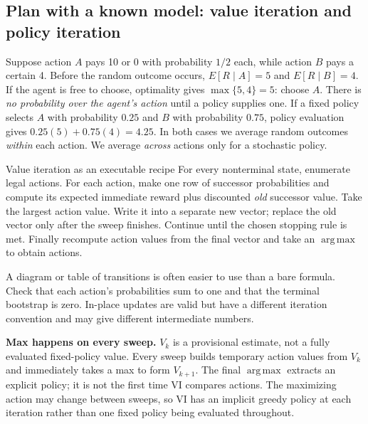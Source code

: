 \documentclass[10pt,a4paper]{article}
\newcommand{\argmax}{\operatorname*{arg\,max}}
\begin{document}
\subsection{Plan with a known model: value iteration and policy iteration}
\begin{idea}
Suppose action $A$ pays 10 or 0 with probability $1/2$ each, while action $B$ pays a certain 4. Before the random outcome occurs, $E[R\mid A]=5$ and $E[R\mid B]=4$. If the agent is free to choose, optimality gives $\max\{5,4\}=5$: choose $A$. There is \emph{no probability over the agent's action} until a policy supplies one. If a fixed policy selects $A$ with probability $0.25$ and $B$ with probability $0.75$, policy evaluation gives $0.25(5)+0.75(4)=4.25$. In both cases we average random outcomes \emph{within} each action. We average \emph{across} actions only for a stochastic policy.
\end{idea}
\begin{card}{Value iteration as an executable recipe}
For every nonterminal state, enumerate legal actions. For each action, make one row of successor probabilities and compute its expected immediate reward plus discounted \emph{old} successor value. Take the largest action value. Write it into a separate new vector; replace the old vector only after the sweep finishes. Continue until the chosen stopping rule is met. Finally recompute action values from the final vector and take an $\argmax$ to obtain actions.

A diagram or table of transitions is often easier to use than a bare formula. Check that each action's probabilities sum to one and that the terminal bootstrap is zero. In-place updates are valid but have a different iteration convention and may give different intermediate numbers.

\textbf{Max happens on every sweep.} $V_k$ is a provisional estimate, not a fully evaluated fixed-policy value. Every sweep builds temporary action values from $V_k$ and immediately takes a max to form $V_{k+1}$. The final $\argmax$ extracts an explicit policy; it is not the first time VI compares actions. The maximizing action may change between sweeps, so VI has an implicit greedy policy at each iteration rather than one fixed policy being evaluated throughout.
\end{card}
\end{document}
